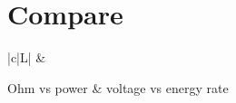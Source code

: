 \needspace{154pt}

\section{Compare}
\label{sec:compare}

\begin{tabularx}{\textwidth}{|c|L|}
    \hline
     &
     \\ \hline
\endhead

    Ohm vs power &
    voltage vs energy rate \\ \hline

\caption{Compare}
\label{tab:compare}
\end{tabularx}
